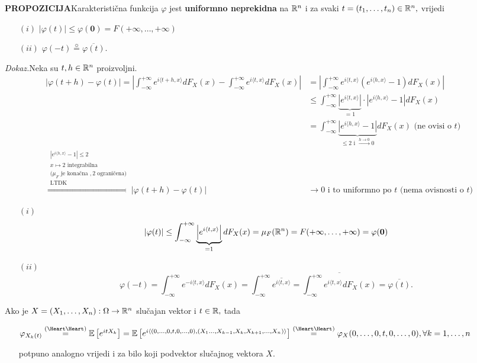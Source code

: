 \documentclass{article}
\begin{document}
\textbf{PROPOZICIJA}\newline Karakteristična funkcija \(\varphi\) jest \textbf{uniformno neprekidna} na \(\Bbb R^n\) i za svaki \(t=(t_1,\ldots,t_n)\in\Bbb R^n,\) vrijedi
\begin{enumerate}
    \item[\((i)\)] \(|\varphi(t)|\le\varphi(\mathbf 0)=F(+\infty,\ldots,+\infty)\)
    \item[\((ii)\)] \(\varphi(-t)\overset{\sun}{=}\overline{\varphi(t)}.\)
\end{enumerate}
\textit{Dokaz.}\newline Neka su \(t,h\in\Bbb R^n\) proizvoljni. \[\begin{aligned}|\varphi(t+h)-\varphi(t)|=\left|\int_{-\infty}^{+\infty}e^{i\langle t+h,x\rangle}dF_X(x)-\int_{-\infty}^{+\infty}e^{i\langle t,x\rangle }dF_X(x)\right|&=\left|\int_{-\infty}^{+\infty}e^{i\langle t,x\rangle}\left(e^{i\langle h,x\rangle}-1\right)dF_X(x)\right|\\&\le\int_{-\infty}^{+\infty}\underbrace{\left|e^{i\langle t,x\rangle}\right|}_{=1}\cdot\left|e^{i\langle h,x\rangle}-1\right|dF_X(x)\\&=\int_{-\infty}^{+\infty}\underbrace{\left|e^{i\langle h,x\rangle}-1\right|}_{\le 2\text{ i }\overset{h\to 0}{\longrightarrow}0}dF_X(x)\text{ (ne ovisi o }t)\\\overset{\substack{\left|e^{i\langle h,x\rangle}-1\right|\le 2\\x\mapsto 2\text{ integrabilna}\\(\mu_F\text{ je konačna }, 2\text{ ograničena)}\\\text{LTDK}}}{\Rightarrow}|\varphi(t+h)-\varphi(t)|&\to 0\text{ i to uniformno po }t\text{ (nema ovisnosti o }t)\end{aligned}\]
\begin{enumerate}
    \item[\((i)\)] \[|\varphi(t)|\le\int_{-\infty}^{+\infty}\underbrace{\left|e^{i\langle t,x\rangle}\right|}_{=1}dF_X(x)=\mu_F(\Bbb R^n)=F(+\infty,\ldots,+\infty)=\varphi(\mathbf 0)\]
    \item[\((ii)\)] \[\varphi(-t)=\int_{-\infty}^{+\infty}e^{-i\langle t,x\rangle}dF_X(x)=\int_{-\infty}^{+\infty}\overline{e^{i\langle t,x\rangle}}=\overline{\int_{-\infty}^{+\infty}e^{i\langle t,x\rangle}dF_X(x)}=\overline{\varphi(t)}.\]
\end{enumerate}
Ako je \(X=(X_1,\ldots,X_n):\Omega\to\Bbb R^n\) slučajan vektor i \(t\in\Bbb R,\) tada
\begin{itemize}
    \item[\ding{113}] \(\varphi_{X_k(t)}\overset{\text{(\Heart\Heart)}}{=}\Bbb E\left[e^{itX_k}\right]=\Bbb E\left[e^{i\langle(0,\ldots,0,t,0,\ldots,0),(X_1\ldots,X_{k-1},X_k,X_{k+1},\ldots,X_n)\rangle}\right]\overset{\text{(\Heart\Heart)}}{=}\varphi_X(0,\ldots,0,t,0,\ldots,0),\forall k=1,\ldots,n\)
    \item[\ding{113}] potpuno analogno vrijedi i za bilo koji podvektor slučajnog vektora \(X.\)
\end{itemize}
\end{document}
